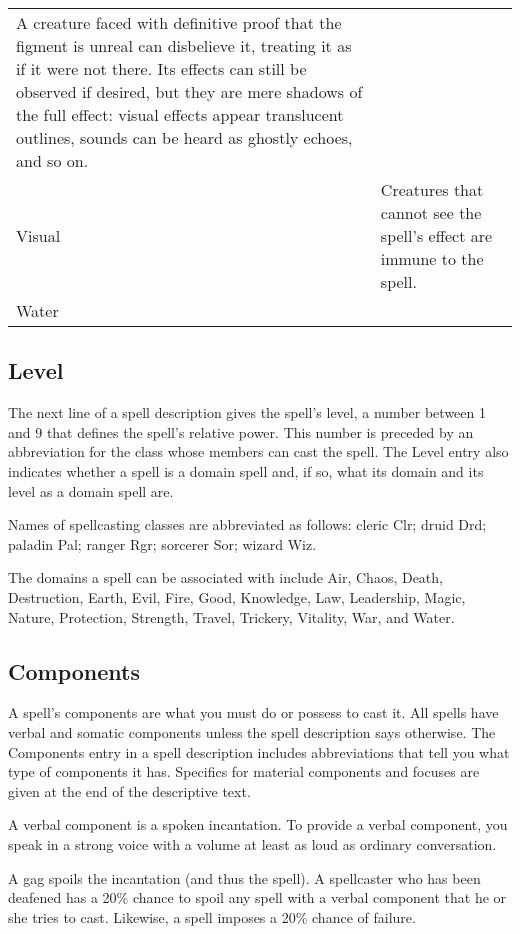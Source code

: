 {\begin{longtabu}{l X}
        A creature faced with definitive proof that the figment is unreal can disbelieve it, treating it as if it were not there. Its effects can still be observed if desired, but they are mere shadows of the full effect: visual effects appear translucent outlines, sounds can be heard as ghostly echoes, and so on. \\
        Visual & Creatures that cannot see the spell's effect are immune to the spell. \\
        Water & \x \\
    \end{longtabu}
    \twocolumn
}

\subsection{Level}
The next line of a spell description gives the spell's level, a number between 1 and 9 that defines the spell's relative power. This number is preceded by an abbreviation for the class whose members can cast the spell. The Level entry also indicates whether a spell is a domain spell and, if so, what its domain and its level as a domain spell are.

Names of spellcasting classes are abbreviated as follows: cleric Clr; druid Drd; paladin Pal; ranger Rgr; sorcerer Sor; wizard Wiz.

The domains a spell can be associated with include Air, Chaos, Death, Destruction, Earth, Evil, Fire, Good, Knowledge, Law, Leadership, Magic, Nature, Protection, Strength, Travel, Trickery, Vitality, War, and Water.

\subsection{Components}
A spell's components are what you must do or possess to cast it. All spells have verbal and somatic components unless the spell description says otherwise. The Components entry in a spell description includes abbreviations that tell you what type of components it has. Specifics for material components and focuses are given at the end of the descriptive text.

 A verbal component is a spoken incantation. To provide a verbal component, you speak in a strong voice with a volume at least as loud as ordinary conversation.

A gag spoils the incantation (and thus the spell). A spellcaster who has been deafened has a 20\% chance to spoil any spell with a verbal component that he or she tries to cast. Likewise, a  spell imposes a 20\% chance of failure.

